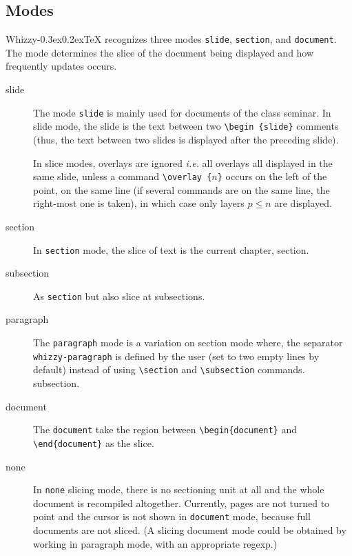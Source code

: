 \documentclass[12pt]{article}
\makeatletter
\let \lst \verb
\def \whizzy {{Whizzy\kern -0.3ex\raise 0.2ex\hbox{\let \@\relax\TeX}}}
\makeatother
\begin{document}
\subsection {Modes} 
\label {modes}

{\whizzy} recognizes three modes \lst"slide", \lst"section", and \lst"document". 
The mode determines the slice of the document being displayed and how
frequently updates occurs. 
\begin{description}

\item [slide]

The mode \lst"slide"  is mainly used for documents of the class seminar. 
In slide mode, the slide is the text between two \lst"\begin {slide}"
comments (thus,  the text between two slides is displayed after the
preceding slide).  

In slice modes, overlays are ignored {\em i.e.} all overlays all displayed in
the same slide, unless a command
\lst"\overlay {"$n$\lst"}" occurs on the left of the point, on the same line
(if several commands are on the same line, the 
right-most one is taken), in which case only layers $p \le n$ are displayed.

\item [section]
In \lst"section" mode, the slice of text is the current chapter, section.

\item [subsection]
As \lst"section" but also slice at subsections. 

\item [paragraph]
The \lst"paragraph" mode is a variation on section mode where, the separator
\lst"whizzy-paragraph" is defined by the user (set to two empty lines by
default) instead of using \lst"\section"  and \lst"\subsection" commands. 
subsection.

\item [document]
The \lst"document" take the region between \lst"\begin{document}"
and \lst"\end"\lst"{document}" as the slice. 

\item [none]
In \lst"none" slicing mode, there is no sectioning unit at all and
the whole document is recompiled altogether. 
Currently, pages are not turned to point and the 
cursor is not shown in \lst"document" mode, because full documents are not
sliced. (A slicing document mode could be obtained by working in paragraph
mode, with an appropriate regexp.)

\end{description}
\end{document}
